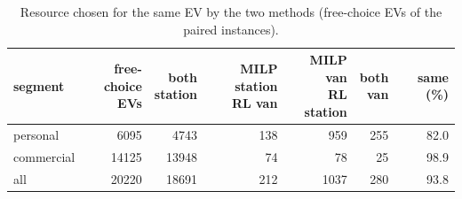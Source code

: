 \begin{table}[H]\centering
\small
\caption{Resource chosen for the same EV by the two methods (free-choice EVs of the paired instances).}\label{tab:agree}
\begin{adjustbox}{max width=\textwidth}\begin{tabular}{lrrrrrr}\toprule
segment & \shortstack{free-choice\\EVs} & \shortstack{both\\station} & \shortstack{MILP station\\RL van} & \shortstack{MILP van\\RL station} & \shortstack{both\\van} & same (\%) \\ \midrule
personal & 6095 & 4743 & 138 & 959 & 255 & 82.0 \\
commercial & 14125 & 13948 & 74 & 78 & 25 & 98.9 \\
all & 20220 & 18691 & 212 & 1037 & 280 & 93.8 \\
\bottomrule\end{tabular}\end{adjustbox}\end{table}
